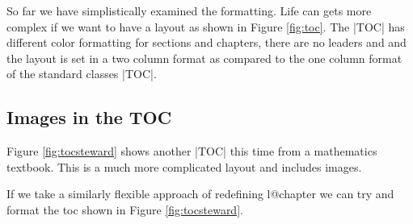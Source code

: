 So far we have simplistically examined the formatting. Life can gets more complex if we want to have a layout as shown in Figure \ref{fig:toc}. The |TOC| has different color formatting for sections and chapters, there are no leaders and and the layout is set in a two column format as compared to the one column format of the standard classes |TOC|.




\begin{teXXX}
\renewcommand\l@chapter[3]{%
  \ifnum \c@tocdepth >\m@ne
    \addpenalty{-\@highpenalty}%
    \vskip 1.0em \@plus\p@
    \setlength\@tempdima{1.5em}%
    \begingroup
      \parindent \z@ \rightskip \@pnumwidth
      \parfillskip -\@pnumwidth
      \leavevmode
      \advance\leftskip\@tempdima
      \hskip -\leftskip
      \vbox{\raggedright#1\vskip1pt%
      \hrule width3cm height0.4pt}\par
      #2
      \penalty\@highpenalty
    \endgroup
  \fi}
\end{teXXX}



\subsection{Images in the TOC}
Figure \ref{fig:tocsteward} shows another |TOC| this time from a mathematics textbook. This is a much more complicated layout and includes images.

If we take a similarly flexible approach of redefining l@chapter we can try and format the toc shown in Figure \ref{fig:tocsteward}.



\begin{teX}
\renewcommand\l@chapter[3]{%
  \ifnum \c@tocdepth >\m@ne
    \addpenalty{-\@highpenalty}%
    \vskip 1.0em \@plus\p@
    \begingroup
      \parindent \z@
      \leavevmode
      \vbox{\raggedright\colorbox{blue}{\color{white}\bfseries \sffamily#1} #2\qquad  #3\vskip0pt%
      \color{blue}\hrule width0.7\textwidth height0.4pt}\par
      \penalty\@highpenalty
    \endgroup
  \fi}
\end{teX}




